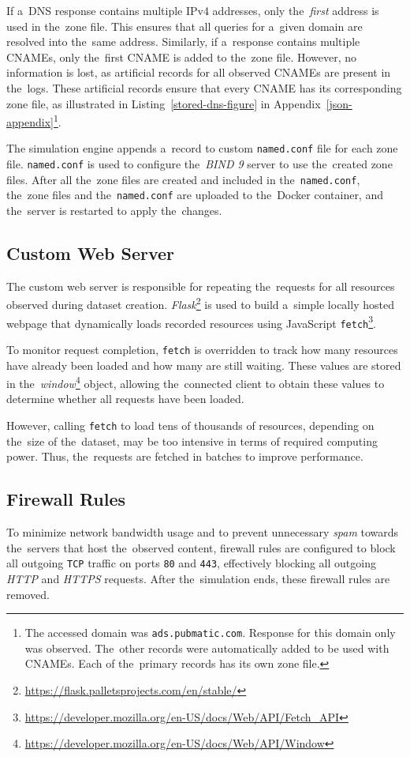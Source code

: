 If a~DNS response contains multiple IPv4 addresses, only the~\emph{first} address is used in the~zone file. This ensures that all queries for a~given domain are resolved into the~same address. Similarly, if a~response contains multiple CNAMEs, only the~first CNAME is added to the~zone file. However, no information is lost, as artificial records for all observed CNAMEs are present in the~logs. These artificial records ensure that every CNAME has its corresponding zone file, as illustrated in Listing~\ref{stored-dns-figure} in Appendix~\ref{json-appendix}\footnote{The accessed domain was \texttt{ads.pubmatic.com}. Response for this domain only was observed. The~other records were automatically added to be used with CNAMEs. Each of the~primary records has its own zone file.}.

The simulation engine appends a~record to custom \texttt{named.conf} file for each zone file. \texttt{named.conf} is used to configure the~\textit{BIND 9} server to use the~created zone files. 
After all the~zone files are created and included in the~\texttt{named.conf}, the~zone files and the~\texttt{named.conf} are uploaded to the~Docker container, and the~server is restarted to apply the~changes.


\subsection{Custom Web Server}
The custom web server is responsible for repeating the~requests for all resources observed during dataset creation. \textit{Flask}\footnote{\url{https://flask.palletsprojects.com/en/stable/}} is used to build a~simple locally hosted webpage that dynamically loads recorded resources using JavaScript \texttt{fetch}\footnote{\url{https://developer.mozilla.org/en-US/docs/Web/API/Fetch\_API}}.

To monitor request completion, \texttt{fetch} is overridden to track how many resources have already been loaded and how many are still waiting. These values are stored in the~\textit{window}\footnote{\url{https://developer.mozilla.org/en-US/docs/Web/API/Window}} object, allowing the~connected client to obtain these values to determine whether all requests have been loaded.

However, calling \texttt{fetch} to load tens of thousands of resources, depending on the~size of the~dataset, may be too intensive in terms of required computing power. Thus, the~requests are fetched in batches to improve performance.

\subsection{Firewall Rules}
To minimize network bandwidth usage and to prevent unnecessary \textit{spam} towards the~servers that host the~observed content, firewall rules are configured to block all outgoing \texttt{TCP} traffic on ports \texttt{80} and \texttt{443}, effectively blocking all outgoing \textit{HTTP} and \textit{HTTPS} requests. After the~simulation ends, these firewall rules are removed.

